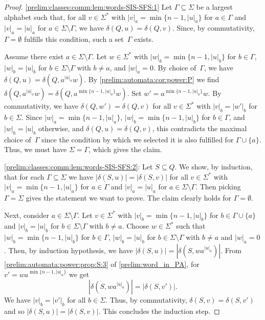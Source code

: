 \begin{proof}
	\ref{prelim:classes:comm:lem:words-SIS-SFS:1} 
	Let  $\Gamma \subseteq \Sigma$ be a largest alphabet
	such that, for all $v \in \Sigma^*$
	with $|v|_a = \min\{ n - 1, |u|_a\}$
	for $a \in \Gamma$
	and $|v|_a = |u|_a$
	for $a \in \Sigma \setminus \Gamma$,
	we have $\delta(Q, u) = \delta(Q, v)$.
	Since, by commutativity, $\Gamma = \emptyset$ 
	fulfills this condition, such a set~$\Gamma$
	exists.	
	
	Assume there exist $a \in \Sigma \setminus \Gamma$.
	Let $w \in \Sigma^*$
	with $|w|_b = \min\{n-1, |u|_b\}$ for $b \in \Gamma$,
	$|w|_b = |u|_b$ for $b \in \Sigma \setminus \Gamma$
	with $b \ne a$,
	and $|w|_a = 0$.
	By choice of~$\Gamma$,
	we have $\delta(Q, u) = \delta(Q, a^{|u|_a} w)$.
	By \cref{prelim:automata:cor:power:P} 
	we find $\delta(Q, a^{|u|_a} w) = \delta(Q, a^{\min\{n - 1, |u|_a\}} w)$.
	Set $w' = a^{\min\{n - 1, |u|_a\}} w$.
	By commutativity,
	we have $\delta(Q, w') = \delta(Q, v)$
	for all $v \in \Sigma^*$
	with $|v|_b = | w' |_b$
	for $b \in \Sigma$.
	Since $|w|_a = \min\{n-1,|u|_a\}$, $|w|_b = \min\{n-1,|u|_b\}$ for $b \in \Gamma$,
	and $|w|_b = |u|_b$ otherwise,
	and $\delta(Q, u) = \delta(Q, v)$,
	this contradicts the maximal choice of~$\Gamma$
	since the condition by which we selected it 
	is also fulfilled for $\Gamma \cup \{a\}$.
	Thus, we must have $\Sigma = \Gamma$, which gives the claim.
		
	\ref{prelim:classes:comm:lem:words-SIS-SFS:2}: Let $S \subseteq Q$. We show, by induction,
	that for each $\Gamma \subseteq \Sigma$ 
	we have $|\delta(S, u)| = |\delta(S, v)|$ for all $v \in \Sigma^*$
	with $|v|_a = \min\{n - 1, |u|_a\}$ for $a \in \Gamma$
	and $|v|_a = |u|_a$ for $a \in \Sigma \setminus \Gamma$.
	Then picking $\Gamma = \Sigma$ gives the statement we want to prove.
	The claim clearly holds for $\Gamma = \emptyset$. 
	
	Next, consider $a \in \Sigma \setminus \Gamma$.
	Let $v \in \Sigma^*$ with $|v|_b = \min\{ n - 1, |u|_b \}$
	for $b \in \Gamma \cup \{a\}$ and $|v|_b = |u|_b$ for $b \in \Sigma \setminus \Gamma$ with $b \ne a$.
	Choose $w \in \Sigma^*$ 
	such that $|w|_b = \min\{n - 1, |u|_b\}$ for $b \in \Gamma$,
	$|w|_b = |u|_b$ for $b \in \Sigma \setminus \Gamma$ with $b \ne a$
	and $|w|_a = 0$.
	Then, by induction hypothesis, we have
	$
	|\delta(S, u)| = |\delta(S, w a^{|u|_a})|.
	$
	From \cref{prelim:automata:power:prop:S:3} of \cref{prelim:word_in_PA},
	for $v' = w a^{\min\{n-1,|u|_a\}}$ we get
	\[
	|\delta(S, w a^{|u|_a})| = |\delta(S, v')|.
	\]
	We have $|v|_b = |v'|_b$ for all $b \in \Sigma$. 
	Thus, by commutativity, $\delta(S, v) = \delta(S, v')$
	and so $|\delta(S, u)| = |\delta(S, v)|$.  This concludes
	the induction step.
\end{proof}

